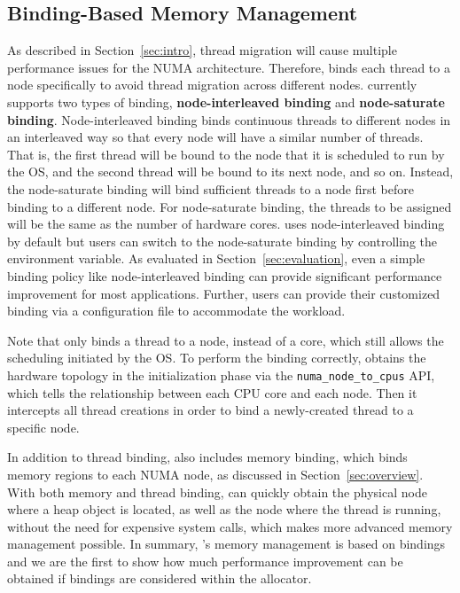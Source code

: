 \subsection{Binding-Based Memory Management} 
\label{sec:balance}
As described in Section~\ref{sec:intro}, thread migration will cause multiple performance issues for the NUMA architecture. Therefore, \NM{} binds each thread to a node specifically to avoid thread migration across different nodes.  \NM{} currently supports two types of binding, \textbf{node-interleaved binding} and \textbf{node-saturate binding}. Node-interleaved binding binds continuous threads to different nodes in an interleaved way so that every node will have a similar number of threads. That is, the first thread will be bound to the node that it is scheduled to run by the OS, and the second thread will be bound to its next node, and so on. Instead, the node-saturate binding will bind sufficient threads to a node first before binding to a different node. For node-saturate binding, the threads to be assigned will be the same as the number of hardware cores.  
\NM{} uses node-interleaved binding by default but users can switch to the node-saturate binding by controlling the environment variable. As evaluated in Section~\ref{sec:evaluation}, even a simple binding policy like node-interleaved binding can provide significant performance improvement for most applications.
Further, users can provide their customized binding via a configuration file to accommodate the workload.

Note that \NM{} only binds a thread to a node, instead of a core, which still allows the scheduling initiated by the OS. To perform the binding correctly, \NM{} obtains the hardware topology in the initialization phase via the \texttt{numa\_node\_to\_cpus} API, which tells the relationship between each CPU core and each node. Then it intercepts all thread creations in order to bind a newly-created thread to a specific node.

In addition to thread binding, \NA{} also includes memory binding, which binds memory regions to each NUMA node, as discussed in Section~\ref{sec:overview}. With both memory and thread binding, \NM{} can quickly obtain the physical node where a heap object is located, as well as the node where the thread is running, without the need for expensive system calls, which makes more advanced memory management possible. 
In summary, \NM{}'s memory management is based on bindings and we are the first to show how much performance improvement can be obtained if bindings are considered within the allocator.

